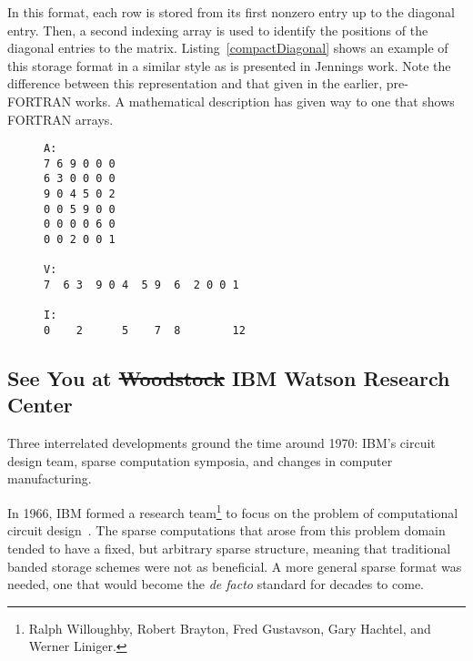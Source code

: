 In this format, each row is stored from its first nonzero entry up to the diagonal entry. 
Then, a second indexing array is used to identify the positions of the diagonal entries to the matrix.
Listing~\ref{compactDiagonal} shows an example of this storage format in a similar style as is presented in Jennings work.
Note the difference between this representation and that given in the earlier, pre-FORTRAN works. 
A mathematical description has given way to one that shows FORTRAN arrays. 

\begin{figure}
\begin{lstlisting}[caption={A symmetric matrix and its compact diagonal storage representation},label={compactDiagonal}]
A:
7 6 9 0 0 0
6 3 0 0 0 0
9 0 4 5 0 2
0 0 5 9 0 0
0 0 0 0 6 0
0 0 2 0 0 1

V:
7  6 3  9 0 4  5 9  6  2 0 0 1

I:
0    2      5    7  8        12
\end{lstlisting}
\end{figure}



\subsection{See You at \sout{Woodstock} IBM Watson Research Center}

Three interrelated developments ground the time around 1970: IBM's circuit design team, sparse computation symposia, and changes in computer manufacturing. 

In 1966, IBM formed a research team\footnote{Ralph Willoughby, Robert Brayton, Fred Gustavson, Gary Hachtel, and Werner Liniger.} to focus on the problem of computational circuit design~\cite{willoughby1971sparse}.
The sparse computations that arose from this problem domain tended to have a fixed, but arbitrary sparse structure, meaning that traditional banded storage schemes were not as beneficial.
A more general sparse format was needed, one that would become the \textit{de facto} standard for decades to come.

